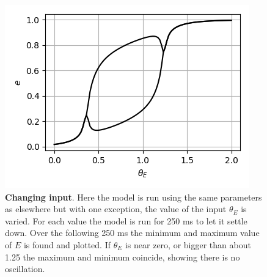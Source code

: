 \documentclass[11pt,a4paper]{scrartcl}
\begin{document}
\begin{figure}
  \begin{center}
  \includegraphics{theta.png}
  \end{center}
  \caption{\textbf{Changing input}. Here the model is run using the same parameters as elsewhere but with one exception, the value of the input $\theta_E$ is varied. For each value the model is run for 250 ms to let it settle down. Over the following 250 ms the minimum and maximum value of $E$ is found and plotted. If $\theta_E$ is near zero, or bigger than about 1.25 the maximum and minimum coincide, showing there is no oscillation.}
  \label{fig:pi}
\end{figure}
\end{document}
